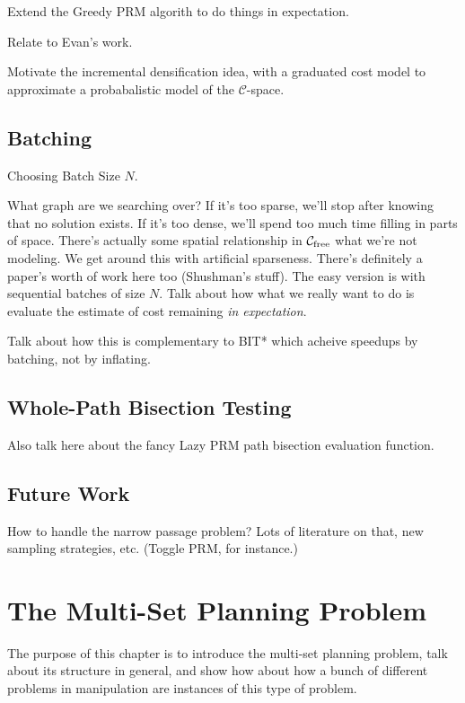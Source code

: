 \documentclass{report}
\begin{document}
Extend the Greedy PRM algorith to do things in expectation.

Relate to Evan's work.

Motivate the incremental densification idea,
with a graduated cost model
to approximate a probabalistic model
of the $\mathcal{C}$-space.

\section{Batching}

Choosing Batch Size $N$.

What graph are we searching over?
If it's too sparse, we'll stop after knowing that no solution exists.
If it's too dense, we'll spend too much time filling in parts of
space.
There's actually some spatial relationship in
$\mathcal{C}_{\mbox{\scriptsize free}}$ what we're not
modeling.
We get around this with artificial sparseness.
There's definitely a paper's worth of work here too (Shushman's stuff).
The easy version is with sequential batches of size $N$.
Talk about how what we really want to do
is evaluate the estimate of cost remaining
\emph{in expectation}.

Talk about how this is complementary to BIT* which acheive speedups
by batching, not by inflating.

\section{Whole-Path Bisection Testing}

Also talk here about the fancy Lazy PRM path bisection
evaluation function.

\section{Future Work}

How to handle the narrow passage problem?
Lots of literature on that, new sampling strategies, etc.
(Toggle PRM, for instance.)


\newpage
\chapter{The Multi-Set Planning Problem}
\label{chap:multi-set}

The purpose of this chapter is to introduce the multi-set planning
problem,
talk about its structure in general,
and show how about how a bunch of different problems in manipulation
are instances of this type of problem.
\end{document}
